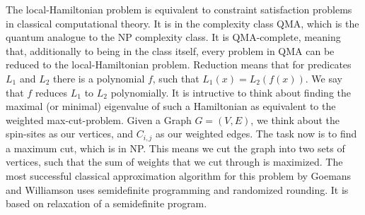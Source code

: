 The local-Hamiltonian problem is equivalent to constraint satisfaction problems in classical computational theory.
It is in the complexity class QMA, which is the quantum analogue to the NP complexity class.
It is QMA-complete, meaning that, additionally to being in the class itself, every problem in QMA can be reduced to the local-Hamiltonian problem.\cite{kempe06}
Reduction means that for predicates $L_1$ and $L_2$ there is a polynomial $f$, such that $L_1(x)=L_2(f(x))$.
We say that $f$ reduces  $L_1$ to $L_2$ polynomially.\cite{kitaev02}
It is intructive to think about finding the maximal (or minimal) eigenvalue of such a Hamiltonian as equivalent to the weighted max-cut-problem.
Given a Graph $G=(V,E)$, we think about the spin-sites as our vertices, and $C_{i,j}$ as our weighted edges.
The task now is to find a maximum cut, which is in NP.
This means we cut the graph into two sets of vertices, such that the sum of weights that we cut through is maximized.
The most successful classical approximation algorithm for this problem by Goemans and Williamson uses semidefinite programming and randomized rounding. \cite{goemans95}
It is based on relaxation of a semidefinite program.
